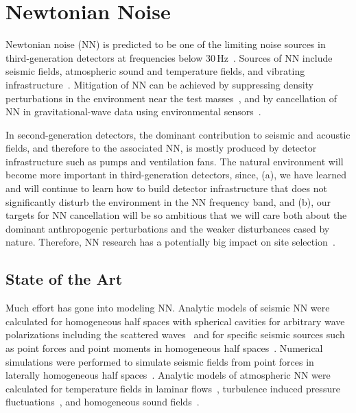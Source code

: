 
\chapter{Newtonian Noise}
\label{sec:Newtonian_Noise}
\vspace{0.5cm}
Newtonian noise (NN) is predicted to be one of the limiting noise sources in third-generation detectors at frequencies below 30\,Hz~\cite{Saulson:NN,Har2015}. Sources of NN include seismic fields, atmospheric sound and temperature fields, and vibrating infrastructure~\cite{HuTh1998,BeEA1998,Cre2008,FiEA2018,Har2015}. Mitigation of NN can be achieved by suppressing density perturbations in the environment near the test masses~\cite{HaHi2014}, and by cancellation of NN in gravitational-wave data using environmental sensors~\cite{Cel2000,CoEA2016a}.

\begin{samepage} %

In second-generation detectors, the dominant contribution to seismic and acoustic fields, and therefore to the associated NN, is mostly produced by detector infrastructure such as pumps and ventilation fans. The natural environment will become more important in third-generation detectors, since, (a), we have learned and will continue to learn how to build detector infrastructure that does not significantly disturb the environment in the NN frequency band, and (b), our targets for NN cancellation will be so ambitious that we will care both about the dominant anthropogenic perturbations and the weaker disturbances cased by nature. Therefore, NN research has a potentially big impact on site selection~\cite{BeEA2010}. 


\section{State of the Art}
Much effort has gone into modeling NN. Analytic models of seismic NN were calculated for homogeneous half spaces with spherical cavities for arbitrary wave polarizations including the scattered waves~\cite{Har2015} and for specific seismic sources such as point forces and point moments in homogeneous half spaces~\cite{HaEA2015,Har2016}. Numerical simulations were performed to simulate seismic fields from point forces in laterally homogeneous half spaces~\cite{BeEA2010c}. Analytic models of atmospheric NN were calculated for temperature fields in laminar flows~\cite{Cre2008}, turbulence induced pressure fluctuations~\cite{Har2015}, and homogeneous sound fields~\cite{FiEA2018}. 

\end{samepage} %

